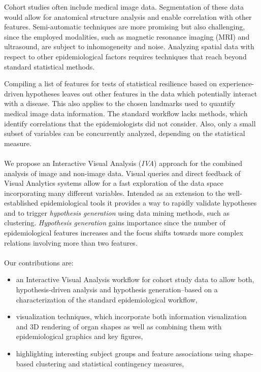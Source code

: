 \documentclass[journal]{style/vgtc} 			          %
\begin{document}
%
Cohort studies often include medical image data.
%
Segmentation of these data would allow for anatomical structure analysis and enable correlation with other features.
%
Semi-automatic techniques are more promising but also challenging, since the employed modalities, such as magnetic resonance imaging (MRI) and ultrasound, are subject to inhomogeneity and noise.
%
Analyzing spatial data with respect to other epidemiological factors requires techniques that reach beyond standard statistical methods.

Compiling a list of features for tests of statistical resilience based on experience-driven hypotheses leaves out other features in the data which potentially interact with a disease.
%
This also applies to the chosen landmarks used to quantify medical image data information.
%
The standard workflow lacks methods, which identify correlations that the epidemiologists did not consider.
%
Also, only a small subset of variables can be concurrently analyzed, depending on the statistical measure.
\\\\
We propose an Interactive Visual Analysis (\emph{IVA}) approach \cite{Thomas2005} for the combined analysis of image and non-image data.
%
Visual queries and direct feedback of Visual Analytics systems allow for a fast exploration of the data space incorporating many different variables.
%
Intended as an extension to the well-established epidemiological tools it provides a way to rapidly validate hypotheses and to trigger \emph{hypothesis generation} using data mining methods, such as clustering.
%
\emph{Hypothesis generation} gains importance since the number of epidemiological features increases and the focus shifts towards more complex relations involving more than two features.
\\\\
Our contributions are:
\begin{itemize}
	\item an Interactive Visual Analysis workflow for cohort study data to allow both, hypothesis-driven analysis and hypothesis generation--based on a characterization of the standard epidemiological workflow,
	\item visualization techniques, which incorporate both information visualization and 3D rendering of organ shapes as well as combining them with epidemiological graphics and key figures,
	\item highlighting interesting subject groups and feature associations using shape-based clustering and statistical contingency measures,
\end{itemize}
\end{document}

